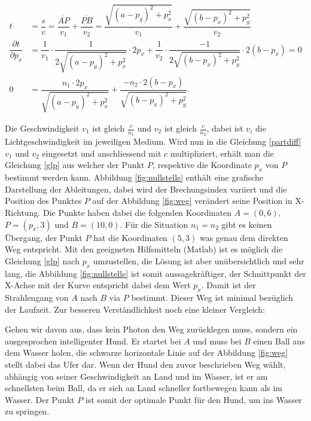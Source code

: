 \begin{refsection}
\begin{align}
t&=\dfrac{s}{v}=\dfrac{\overline{AP}}{v_{1}}+\dfrac{\overline{PB}}{v_{2}}= 
\dfrac{\sqrt{(a-p_{y})^{2}+p_{x}^{2}}}{v_{1}}+ 
\dfrac{\sqrt{(b-p_{x})^{2}+p_{y}^{2}}}{v_{2}}
\label{tbest}
\\
\dfrac{\partial t}{\partial p_{x}}&=
\dfrac{1}{v_{1}}\cdot \dfrac{1}{2 \sqrt{(a-p_{y})^{2}+p_{x}^{2}}}\cdot 2p_{x} +
\dfrac{1}{v_{2}}\cdot \dfrac{-1}{2 \sqrt{(b-p_{x})^{2}+p_{y}^{2}}}\cdot 2(b-p_{x})= 0
\label{partdiff}
\\
0&=
\dfrac{n_{1}\cdot 2p_{x} }{\sqrt{(a-p_{y})^{2}+p_{x}^{2}}}+
\dfrac{-n_{2}\cdot 2(b-p_{x})}{\sqrt{(b-p_{x})^{2}+p_{y}^{2}}}.
\label{glp}
\end{align}

Die Geschwindigkeit $ v_{1}$ ist gleich $\frac{c}{n_{1}} $ und $ v_{2}$
ist gleich $\frac{c}{n_{2}}$, dabei ist $v_{i}$ die Lichtgeschwindigkeit
im jeweiligen Medium. Wird nun in die Gleichung \eqref{partdiff} $ v_{1}$
und $ v_{2}$ eingesetzt und anschliessend mit $c$ multipliziert, erhält
man die Gleichung \eqref{glp} aus welcher der Punkt $P$, respektive die
Koordinate $p_{x}$ von $P$ bestimmt werden kann.
Abbildung \ref{fig:nullstelle} enthält eine grafische Darstellung der
Ableitungen, dabei wird der Brechungsindex variiert und die Position des
Punktes $P$ auf der Abbildung \ref{fig:weg} verändert seine Position
in X-Richtung. Die  Punkte haben dabei die folgenden Koordinaten $A =
(0,6)$, $P=(p_{x},3)$ und $B=(10,0)$. Für die Situation $n_{1}=n_{2}$
gibt es keinen Übergang, der Punkt $P$ hat die Koordinaten $(5,3)$
was genau dem direkten Weg entspricht. Mit den geeigneten Hilfsmitteln
(Matlab) ist es möglich die Gleichung \eqref{glp} nach $p_{x}$
umzustellen, die Lösung ist aber unübersichtlich und sehr lang,
die Abbildung \ref{fig:nullstelle} ist somit aussagekräftiger, der
Schnittpunkt der X-Achse mit der Kurve entspricht dabei dem Wert $p_{x}$.
Damit ist der Strahlengang von $A$ nach $B$ via $P$ bestimmt. Dieser
Weg ist minimal bezüglich der Laufzeit. \newline
Zur besseren Verständlichkeit noch eine kleiner Vergleich:

Gehen wir davon aus, dass kein Photon den Weg zurücklegen muss, sondern
ein ausgesprochen intelligenter Hund. Er startet bei $A$ und muss bei $B$
einen Ball aus dem Wasser holen, die schwarze horizontale Linie auf der
Abbildung \ref{fig:weg} stellt dabei das Ufer dar. Wenn der Hund den
zuvor beschrieben Weg wählt, abhängig von seiner Geschwindigkeit an
Land und im Wasser, ist er am schnellsten beim Ball, da er sich an Land
schneller fortbewegen kann als im Wasser. Der Punkt $P$ ist somit der
optimale Punkt für den Hund, um ins Wasser zu springen.


\end{refsection}
